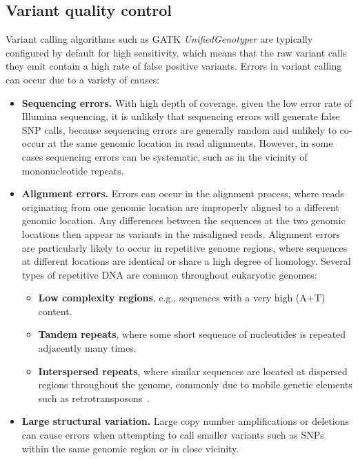 \documentclass[a4paper,11pt,abstracton,hidelinks]{scrartcl}
\begin{document}
\subsection{Variant quality control}\label{subsec:variant-quality-control}


Variant calling algorithms such as GATK \textit{UnifiedGenotyper} are typically configured by default for high sensitivity, which means that the raw variant calls they emit contain a high rate of false positive variants.
%
Errors in variant calling can occur due to a variety of causes:
\begin{itemize}
%
\item \textbf{Sequencing errors.} With high depth of coverage, given the low error rate of Illumina sequencing, it is unlikely that sequencing errors will generate false SNP calls, because sequencing errors are generally random and unlikely to co-occur at the same genomic location in read alignments.
%
However, in some cases sequencing errors can be systematic, such as in the vicinity of mononucleotide repeats.
%
\item \textbf{Alignment errors.} Errors can occur in the alignment process, where reads originating from one genomic location are improperly aligned to a different genomic location.
%
Any differences between the sequences at the two genomic locations then appear as variants in the misaligned reads.
%
Alignment errors are particularly likely to occur in repetitive genome regions, where sequences at different locations are identical or share a high degree of homology.
%
Several types of repetitive DNA are common throughout eukaryotic genomes:
%
\begin{itemize}
%
\item \textbf{Low complexity regions}, e.g., sequences with a very high (A+T) content.
%
\item \textbf{Tandem repeats}, where some short sequence of nucleotides is repeated adjacently many times.
%
\item \textbf{Interspersed repeats}, where similar sequences are located at dispersed regions throughout the genome, commonly due to mobile genetic elements such as retrotransposons~\parencite{Tu2004,FernandezMedina2011}.
%
\end{itemize}
%
\item \textbf{Large structural variation.} Large copy number amplifications or deletions can cause errors when attempting to call smaller variants such as SNPs within the same genomic region or in close vicinity.

\end{itemize}
\end{document}
